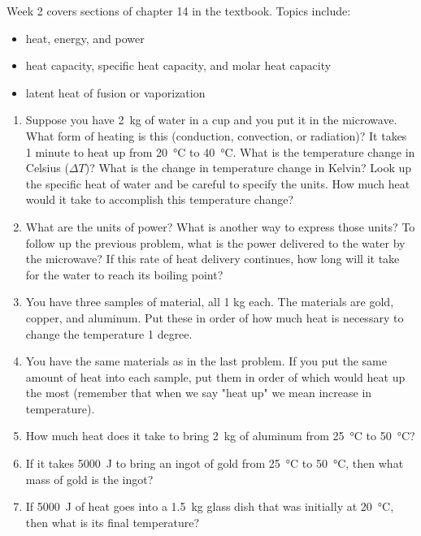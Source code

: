 Week 2 covers sections of chapter 14 in the textbook. Topics include:

\begin{itemize}
	\item heat, energy, and power
	\item heat capacity, specific heat capacity, and molar heat capacity
	\item latent heat of fusion or vaporization
\end{itemize}


\begin{enumerate}
\setlength\itemsep{2 in}

\item
Suppose you have \SI{2}{\kilogram} of water in a cup and you put it in the microwave. What form of heating is this (conduction, convection, or radiation)? It takes 1 minute to heat up from \SI{20}{\celsius} to \SI{40}{\celsius}. What is the temperature change in Celsius ($\Delta T$)? What is the change in temperature change in Kelvin? Look up the specific heat of water and be careful to specify the units. How much heat would it take to accomplish this temperature change?

\item
What are the units of power? What is another way to express those units? To follow up the previous problem, what is the power delivered to the water by the microwave? If this rate of heat delivery continues, how long will it take for the water to reach its boiling point?

\item
You have three samples of material, all 1 kg each. The materials are gold, copper, and aluminum. Put these in order of how much heat is necessary to change the temperature 1 degree. 

\item
You have the same materials as in the last problem. If you put the same amount of heat into each sample, put them in order of which would heat up the most (remember that when we say "heat up" we mean increase in temperature).

\item
How much heat does it take to bring \SI{2}{\kilogram} of aluminum from \SI{25}{\celsius} to \SI{50}{\celsius}?

\item
If it takes \SI{5000}{\joule} to bring an ingot of gold from \SI{25}{\celsius} to \SI{50}{\celsius}, then what mass of gold is the ingot?

\item
If \SI{5000}{\joule} of heat goes into a \SI{1.5}{\kilogram} glass dish that was initially at \SI{20}{\celsius}, then what is its final temperature?


\end{enumerate}
